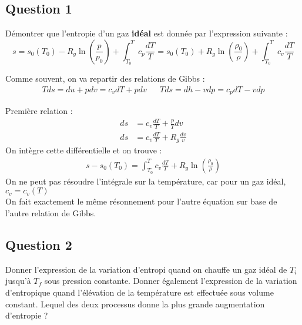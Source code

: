 \subsection*{Question 1}

Démontrer que l'entropie d'un gaz \textbf{idéal} est donnée par l'expression suivante : 
\begin{equation*}
    s = s_0(T_0) - R_g \ln \left(\frac{p}{p_0}\right) + \int_{T_0} ^T c_p \frac{dT}{T} = s_0(T_0) + R_g \ln \left(\frac{\rho_0}{\rho}\right) + \int_{T_0}^T c_v \frac{dT}{T}
\end{equation*}

\begin{tcolorbox}
    Comme souvent, on va repartir des relations de Gibbs : 
    \begin{align*}
        Tds = du + pdv = c_v dT + pdv& & Tds = dh - vdp = c_p dT - vdp
    \end{align*}

    Première relation : 
    \begin{align*}
        ds &= c_v \frac{dT}{T} + \frac{p}{T}dv\\
        ds &= c_v \frac{dT}{T} + R_g \frac{dv}{v}
    \end{align*}
    On intègre cette différentielle et on trouve : 
    \begin{align*}
        s - s_0(T_0) = \int_{T_0}^T c_v \frac{dT}{T} + R_g \ln \left(\frac{\rho_0}{\rho}\right)
    \end{align*}
    On ne peut pas résoudre l'intégrale sur la température, car pour un gaz idéal, $c_v = c_v(T)$\\

    On fait exactement le même résonnement pour l'autre équation sur base de l'autre relation de Gibbs.
\end{tcolorbox}

\subsection*{Question 2}

Donner l'expression de la variation d'entropi quand on chauffe un gaz idéal de $T_i$ jusqu'à $T_f$ sous pression constante. Donner également l'expression de la variation d'entropique quand l'élévation de la température est effectuée sous volume constant.
Lequel des deux processus donne la plus grande augmentation d'entropie ?

